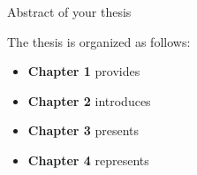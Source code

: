 Abstract of your thesis

The thesis is organized as follows:

\begin{itemize}
  \item \textbf{Chapter 1} provides
  \item \textbf{Chapter 2} introduces
  \item \textbf{Chapter 3} presents
  \item \textbf{Chapter 4} represents
\end{itemize}

\pagebreak